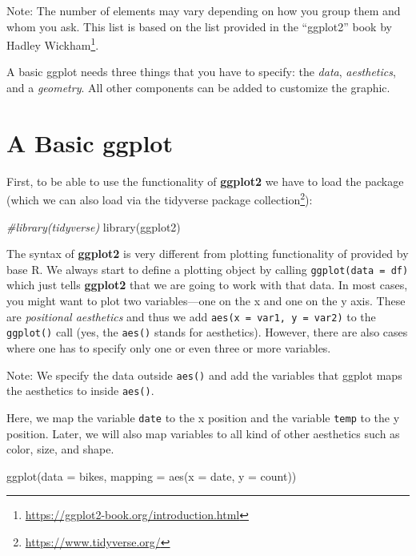 \documentclass[
]{krantz}
\makeatletter
\newenvironment{Shaded}{\begin{snugshade}}{\end{snugshade}}
\newcommand{\AttributeTok}[1]{\textcolor[rgb]{0.61,0.61,0.61}{#1}}
\newcommand{\CommentTok}[1]{\textcolor[rgb]{0.37,0.37,0.37}{\textit{#1}}}
\newcommand{\FunctionTok}[1]{\textcolor[rgb]{0,0,0}{#1}}
\newcommand{\NormalTok}[1]{#1}
\renewcommand{\href}[2]{#2\footnote{\url{#1}}}
\newenvironment{kframe}{%
\medskip{}
\setlength{\fboxsep}{.8em}
 \def\at@end@of@kframe{}%
 \ifinner\ifhmode%
  \def\at@end@of@kframe{\end{minipage}}%
  \begin{minipage}{\columnwidth}%
 \fi\fi%
 \def\FrameCommand##1{\hskip\@totalleftmargin \hskip-\fboxsep
 \colorbox{shadecolor}{##1}\hskip-\fboxsep
     \hskip-\linewidth \hskip-\@totalleftmargin \hskip\columnwidth}%
 \MakeFramed {\advance\hsize-\width
   \@totalleftmargin\z@ \linewidth\hsize
   \@setminipage}}%
 {\par\unskip\endMakeFramed%
 \at@end@of@kframe}
\renewenvironment{Shaded}{\begin{kframe}}{\end{kframe}}
\makeatother
\begin{document}
Note: The number of elements may vary depending on how you group them and whom you ask. This list is based on the list provided in the \href{https://ggplot2-book.org/introduction.html}{``ggplot2'' book by Hadley Wickham}.

A basic ggplot needs three things that you have to specify: the \emph{data}, \emph{aesthetics}, and a \emph{geometry}. All other components can be added to customize the graphic.

\hypertarget{default}{%
\section{A Basic ggplot}\label{default}}

First, to be able to use the functionality of \textbf{ggplot2} we have to load the package (which we can also load via the \href{https://www.tidyverse.org/}{tidyverse package collection}):

\begin{Shaded}
\begin{Highlighting}[]
\CommentTok{\#library(tidyverse)}
\FunctionTok{library}\NormalTok{(ggplot2)}
\end{Highlighting}
\end{Shaded}

The syntax of \textbf{ggplot2} is very different from plotting functionality of provided by base R. We always start to define a plotting object by calling \texttt{ggplot(data\ =\ df)} which just tells \textbf{ggplot2} that we are going to work with that data. In most cases, you might want to plot two variables---one on the x and one on the y axis. These are \emph{positional aesthetics} and thus we add \texttt{aes(x\ =\ var1,\ y\ =\ var2)} to the \texttt{ggplot()} call (yes, the \texttt{aes()} stands for aesthetics). However, there are also cases where one has to specify only one or even three or more variables.

Note: We specify the data outside \texttt{aes()} and add the variables that ggplot maps the aesthetics to inside \texttt{aes()}.

Here, we map the variable \texttt{date} to the x position and the variable \texttt{temp} to the y position. Later, we will also map variables to all kind of other aesthetics such as color, size, and shape.

\begin{Shaded}
\begin{Highlighting}[]
\FunctionTok{ggplot}\NormalTok{(}\AttributeTok{data =}\NormalTok{ bikes, }\AttributeTok{mapping =} \FunctionTok{aes}\NormalTok{(}\AttributeTok{x =}\NormalTok{ date, }\AttributeTok{y =}\NormalTok{ count))}
\end{Highlighting}
\end{Shaded}
\end{document}

